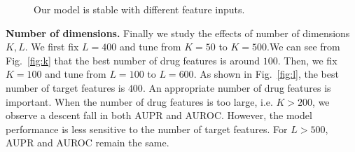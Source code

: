 \documentclass[sigconf,anonymous]{acmart}
\begin{document}
\begin{figure}[!ht]
\centering
{}

\vspace*{-10pt}
\caption{Our model is stable with different feature inputs.}\label{fig:stability}
\end{figure}





\textbf{Number of dimensions.} Finally we study the effects of number of dimensions $K,L$. We first fix $L=400$ and tune from $K=50$ to $K=500$.We can see from Fig.~\ref{fig:k} that the best number of drug features is around $100$. Then, we fix $K=100$ and tune from $L=100$ to $L=600$. As shown in Fig.~\ref{fig:l}, the best number of target features is $400$. An appropriate number of drug features is important. When the number of drug features is too large, i.e. $K>200$, we observe a descent fall in both AUPR and AUROC. However, the model performance is less sensitive to the number of target features. For $L>500$, AUPR and AUROC remain the same.   
\end{document}
